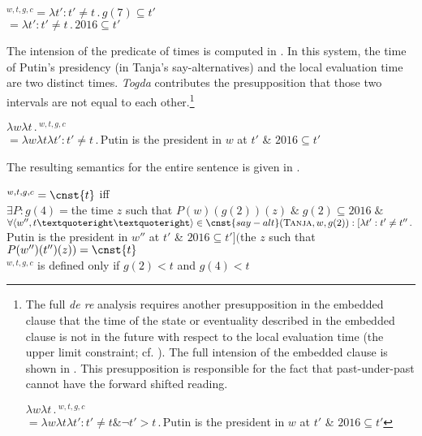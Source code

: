 \documentclass[output=paper,
modfonts,
newtxmath,
hidelinks
]{langscibook}
\begin{document}
\ea {}$^{w,t,g,c}$\tabto{2.3cm}${}=\lambda t':t'\neq t\,.\,g(7)\subseteq t'$\smallskip\\
\tabto{2.3cm}${}=\lambda t':t'\neq t\,.\,2016\subseteq t'$\label{20:ex38}
\z

\noindent The intension of the predicate of times is computed in . In this system, the time of Putin’s presidency (in Tanja’s say-alternatives) and the local evaluation time are two distinct times. \textit{Togda} contributes the presupposition that those two intervals are not equal to each other.\footnote{\label{20:fn11}The full \textit{de re} analysis requires another presupposition in the embedded clause that the time of the state or eventuality described in the embedded clause is not in the future with respect to the local evaluation time (the upper limit constraint; cf. \citealt{Abusch1997}). The full intension of the embedded clause is shown in . This presupposition is responsible for the fact that past-under-past cannot have the forward shifted reading.

\ea $\lambda w\lambda t\,.\,$$^{w,t,g,c}$\\
\hspace{0.5cm}${}=\lambda w\lambda t\lambda t':t'\neq t \&\neg t'>t\,.\,{}$Putin is the president in $w$ at $t'$ \& $2016\subseteq t'$\label{20:fnex1}
\z
}

\ea $\lambda w\lambda t\,.\,$$^{w,t,g,c}$\smallskip\\
\hspace{0.5cm}${}=\lambda w\lambda t\lambda t':t'\neq t\,.\,{}$Putin is the president in $w$ at $t'$ \& $2016\subseteq t'$\label{20:ex39}
\z

\noindent The resulting semantics for the entire sentence is given in .

\ea {}$^{w,t,g,c}=\cnst{t}$ iff\smallskip\\
$\exists P:g(4)={}$the time $z$ such that $P(w)(g(2))(z)\;\&\;g(2)\subseteq 2016\;\&$\\
$\forall\langle w'',t’’\rangle\in\cnst{say-alt}(\textsc{Tanja},w,g(2)): [\lambda t':t'\neq t''\,.\,{}$Putin is the president in $w''$ at $t'$ \& $2016\subseteq t']($the $z$ such that $P(w'')(t'')(z)) =\cnst{t}$\medskip\\
$^{w,t,g,c}$  is defined only if $g(2)<t$ and $g(4)<t$\label{20:ex40}
\z
\end{document}
